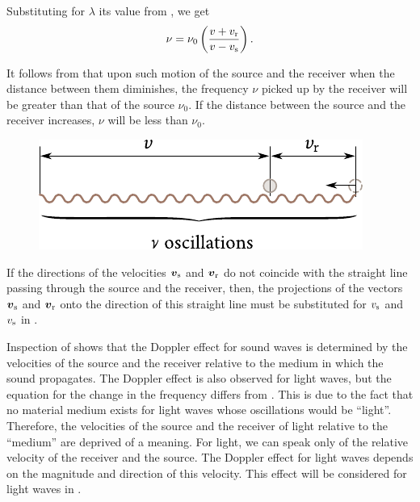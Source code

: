 \noindent
Substituting for $\lambda$ its value from , we get
\begin{equation}\label{eq:14_78}
	\nu = \nu_0 \left(\frac{v + v_{\text{r}}}{v - v_{\text{s}}}\right).
\end{equation}

It follows from  that upon such motion of the source and the receiver when the distance between them diminishes, the frequency $\nu$ picked up by the receiver will be greater than that of the source $\nu_0$.
If the distance between the source and the receiver increases, $\nu$ will be less than $\nu_0$.

\begin{figure}[t]
	\begin{center}
		\includegraphics[scale=1]{figures/ch_14/fig_14_16.pdf}
		\caption[]{}
		\label{fig:14_16}
	\end{center}
	\vspace{-0.8cm}
\end{figure}

If the directions of the velocities $\boldsymbol{v}_{\text{s}}$ and $\boldsymbol{v}_{\text{r}}$ do not coincide with the straight line passing through the source and the receiver, then, the projections of the vectors $\boldsymbol{v}_{\text{s}}$ and $\boldsymbol{v}_{\text{r}}$ onto the direction of this straight line must be substituted for $v_{\text{s}}$ and $v_{\text{s}}$ in .

Inspection of  shows that the Doppler effect for sound waves is determined by the velocities of the source and the receiver relative to the medium in which the sound propagates.
The Doppler effect is also observed for light waves, but the equation for the change in the frequency differs from .
This is due to the fact that no material medium exists for light waves whose oscillations would be ``light''.
Therefore, the velocities of the source and the receiver of light relative to the ``medium'' are deprived of a meaning.
For light, we can speak only of the relative velocity of the receiver and the source.
The Doppler effect for light waves depends on the magnitude and direction of this velocity.
This effect will be considered for light waves in .

